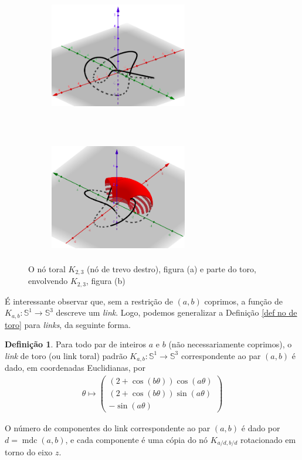 \documentclass[a4paper,portuguese,11pt,twoside, leqno]{book}
\DeclareMathOperator{\mdc}{mdc}
\theoremstyle{definition}
\newtheorem{deff}{Definição}[section]
\begin{document}
	\begin{figure}[H]
		\centering
		\begin{subfigure}[t]{0.5\textwidth}
			\centering
			\includegraphics[width=6cm,height=5cm]{Images/no_de_trevo_parametrizado.png}
			\caption{}
		\end{subfigure}%
		~ 
		\begin{subfigure}[t]{0.5\textwidth}
			\centering
			\includegraphics[width=6cm,height=5cm]{Images/no_de_trevo_no_toro.png}
			\caption{}
		\end{subfigure}
		\caption{O nó toral $K_{2,3}$ (nó de trevo destro), figura (a) e parte do toro, envolvendo $K_{2,3}$, figura (b)}
	\end{figure}
	\par\vspace{0.3cm} É interessante observar que, sem a restrição de $(a,b)$ coprimos, a função de $K_{a,b}:\mathbb{S}^1\to\mathbb{S}^3$ descreve um \textit{link}. Logo, podemos generalizar a Definição \eqref{def no de toro} para \textit{links}, da seguinte forma.
	\begin{deff}
		\label{def link de toro}
		Para todo par de inteiros $a$ e $b$ (não necessariamente coprimos), o \textit{link} de toro (ou link toral) padrão $K_{a,b}: \mathbb{S}^1\to\mathbb{S}^3$ correspondente ao par $(a,b)$ é dado, em coordenadas Euclidianas, por 
		\begin{align*}
		\theta\mapsto
		\left( 
		\begin{matrix}
		(2+\cos(b\theta))\cos(a\theta) \\
		(2+\cos(b\theta))\sin(a\theta) \\
		-\sin(a\theta)
		\end{matrix} 
		\right)
		\end{align*}
		\par\vspace{0.3cm} O número de componentes do link correspondente ao par $(a,b)$ é dado por $d = \mdc(a,b)$, e cada componente é uma cópia do nó $\displaystyle{K_{a/d, b/d}}$ rotacionado em torno do eixo $z$.
	\end{deff}
\end{document}
